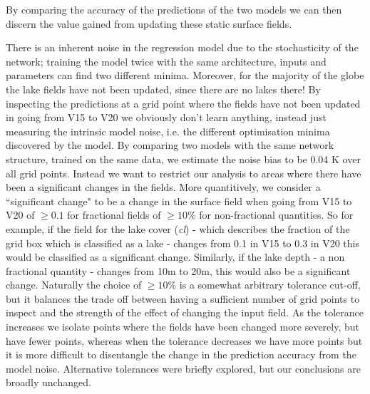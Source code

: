 \documentclass[twocolumn]{article}
\begin{document}
\noindent By comparing the accuracy of the predictions of the two models we can then discern the value gained from updating these static surface fields. \newline 


\noindent There is an inherent noise in the regression model due to the stochasticity of the network; training the model twice with the same architecture, inputs and parameters can find two different minima. Moreover, for the majority of the globe the lake fields have not been updated, since there are no lakes there! By inspecting the predictions at a grid point where the fields have not been updated in going from V15 to V20 we obviously don't learn anything, instead just measuring the intrinsic model noise, i.e. the different optimisation minima discovered by the model. By comparing two models with the same network structure, trained on the same data, we estimate the noise bias to be 0.04 K over all grid points. Instead we want to restrict our analysis to areas where there have been a significant changes in the fields. More quantitively, we consider a ``significant change" to be a change in the surface field when going from V15 to V20 of $\geq 0.1 $ for fractional fields of  $\geq 10 \%$ for non-fractional quantities. So for example, if the field for the lake cover (\textit{cl}) - which describes the fraction of the grid box which is classified as a lake - changes from 0.1 in V15 to 0.3 in V20 this would be classified as a significant change. Similarly, if the lake depth - a non fractional quantity - changes from 10m to 20m, this would also be a significant change. Naturally the choice of $\geq 10 \%$ is a somewhat arbitrary tolerance cut-off, but it balances the trade off between having a sufficient number of grid points to inspect and the strength of the effect of changing the input field. As the tolerance increases we isolate points where the fields have been changed more severely, but have fewer points, whereas when the tolerance decreases we have more points but it is more difficult to disentangle the change in the prediction accuracy from the model noise. Alternative tolerances were briefly explored, but our conclusions are broadly unchanged. \newline 
\end{document}
